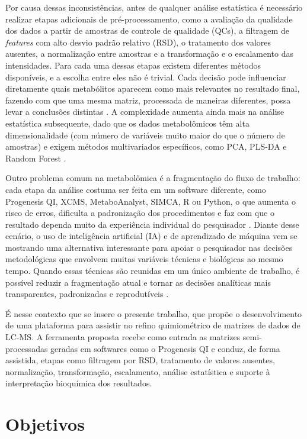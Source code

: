 Por causa dessas inconsistências, antes de qualquer análise estatística é necessário realizar etapas adicionais de pré-processamento, como a avaliação da qualidade dos dados a partir de amostras de controle de qualidade (QCs), a filtragem de \textit{features} com alto desvio padrão relativo (RSD), o tratamento dos valores ausentes, a normalização entre amostras e a transformação e o escalamento das intensidades. Para cada uma dessas etapas existem diferentes métodos disponíveis, e a escolha entre eles não é trivial. Cada decisão pode influenciar diretamente quais metabólitos aparecem como mais relevantes no resultado final, fazendo com que uma mesma matriz, processada de maneiras diferentes, possa levar a conclusões distintas \cite{vandenberg2006centering}. A complexidade aumenta ainda mais na análise estatística subsequente, dado que os dados metabolômicos têm alta dimensionalidade (com número de variáveis muito maior do que o número de amostras) e exigem métodos multivariados específicos, como PCA, PLS-DA e Random Forest \cite{worley2013multivariate}.
 
Outro problema comum na metabolômica é a fragmentação do fluxo de trabalho: cada etapa da análise costuma ser feita em um software diferente, como Progenesis QI, XCMS, MetaboAnalyst, SIMCA, R ou Python, o que aumenta o risco de erros, dificulta a padronização dos procedimentos e faz com que o resultado dependa muito da experiência individual do pesquisador \cite{weber2017computational}. Diante desse cenário, o uso de inteligência artificial (IA) e de aprendizado de máquina vem se mostrando uma alternativa interessante para apoiar o pesquisador nas decisões metodológicas que envolvem muitas variáveis técnicas e biológicas ao mesmo tempo. Quando essas técnicas são reunidas em um único ambiente de trabalho, é possível reduzir a fragmentação atual e tornar as decisões analíticas mais transparentes, padronizadas e reprodutíveis \cite{sen2021deep}.
 
É nesse contexto que se insere o presente trabalho, que propõe o desenvolvimento de uma plataforma para assistir no refino quimiométrico de matrizes de dados de LC-MS. A ferramenta proposta recebe como entrada as matrizes semi-processadas geradas em softwares como o Progenesis QI e conduz, de forma assistida, etapas como filtragem por RSD, tratamento de valores ausentes, normalização, transformação, escalamento, análise estatística e suporte à interpretação bioquímica dos resultados.

\section{Objetivos}

